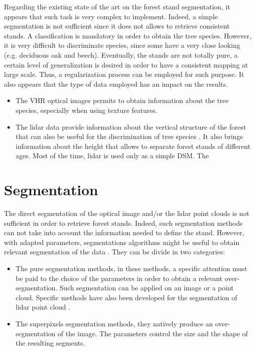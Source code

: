 Regarding the existing state of the art on the forest stand segmentation, it appears that such task is very complex to implement. Indeed, a simple segmentation is not sufficient since it does not allows to retrieve consistent stands. A classification is mandatory in order to obtain the tree species. However, it is very difficult to discriminate species, since some have a very close looking (e.g. deciduous oak and beech). Eventually, the stands are not totally pure, a certain level of generalization is desired in order to have a consistent mapping at large scale. Thus, a regularization process can be employed for such purpose.
It also appears that the type of data employed has an impact on the results.
\begin{itemize}
\item The VHR optical images permits to obtain information about the tree species, especially when using texture features.
\item The lidar data provide information about the vertical structure of the forest that can also be useful for the discrimination of tree species \citep{brandtberg2007classifying}. It also brings information about the height that allows to separate forest stands of different ages. Most of the time, lidar is used only as a simple DSM. The 
\end{itemize}

\section{Segmentation}
\label{sec:C1_seg}
The direct segmentation of the optical image and/or the lidar point clouds is not sufficient in order to retrieve forest stands. Indeed, such segmentation methods can not take into account the information needed to define the stand.  However, with adapted parameters, segmentations algorithms might be useful to obtain relevant segmentation of the data \citep{clement_IJPRS}. They can be divide in two categories:
\begin{itemize}
\item The pure segmentation methods, in these methods, a specific attention must be paid to the choice of the parameters in order to obtain a relevant over-segmentation. Such segmentation can be applied on an image or a point cloud. Specific methods have also been developed for the segmentation of lidar point cloud \citep{nguyen20133d}.
\item The superpixels segmentation methods, they natively produce an over-segmentation of the image. The parameters control the size and the shape of the resulting segments.
\end{itemize}

